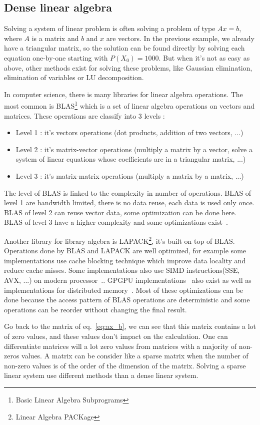 \subsection{Dense linear algebra}
Solving a system of linear problem is often solving a problem of type $Ax=b$, where $A$ is a matrix and $b$ and $x$ are vectors.
%
In the previous example, we already have a triangular matrix, so the solution can be found directly by solving each equation one-by-one starting with $P(X_0) = 1000$.
%
But when it's not as easy as above, other methods exist for solving these problems, like Gaussian elimination, elimination of variables or LU decomposition.


In computer science, there is many libraries for linear algebra operations.
%
The most common is BLAS\footnote{Basic Linear Algebra Subprograms} which is a set of linear algebra operations on vectors and matrices.
%
These operations are classify into 3 levels :
\begin{itemize}
  \item Level 1 : it's vectors operations (dot products, addition of two vectors, ...)
  \item Level 2 : it's matrix-vector operations (multiply a matrix by a vector, solve a system of linear equations whose coefficients are in a triangular matrix, ...)
  \item Level 3 : it's matrix-matrix operations (multiply a matrix by a matrix, ...)
\end{itemize}
%
The level of BLAS is linked to the complexity in number of operations.
%
BLAS of level 1 are bandwidth limited, there is no data reuse, each data is used only once.
%
BLAS of level 2 can reuse vector data, some optimization can be done here.
%
BLAS of level 3 have a higher complexity and some optimizations exist~\cite{blas3_opt}.

Another library for library algebra is LAPACK\footnote{Linear Algebra PACKage}, it's built on top of BLAS.
%
Operations done by BLAS and LAPACK are well optimized, for example some implementations use cache blocking technique which improve data locality and reduce cache misses.
%
Some implementations also use SIMD instructions(SSE, AVX, ...) on modern processor~\cite{intel_mkl}..
%
GPGPU implementations~\cite{nvidia_cublas} also exist as well as implementations for distributed memory~\cite{dplasma}.
%
Most of these optimizations can be done because the access pattern of BLAS operations are deterministic and some operations can be reorder without changing the final result.


Go back to the matrix of eq.~\ref{eq:ax_b}, we can see that this matrix contains a lot of zero values, and these values don't impact on the calculation.
%
One can differentiate matrices will a lot zero values from matrices with a majority of non-zeros values.
%
A matrix can be consider like a sparse matrix when the number of non-zero values is of the order of the dimension of the matrix.
%
Solving a sparse linear system use different methods than a dense linear system.
